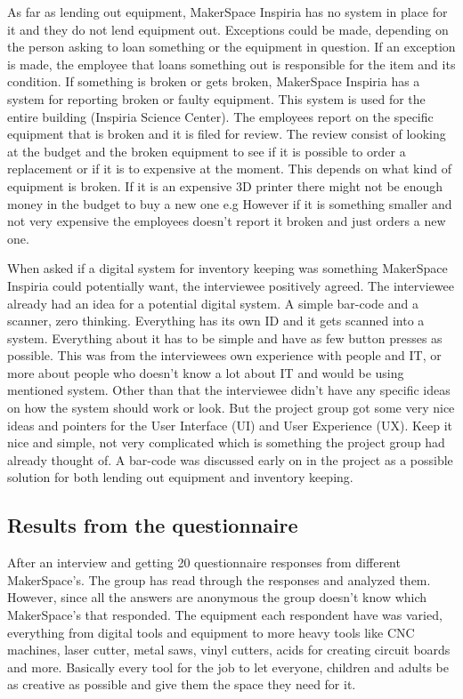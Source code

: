 As far as lending out equipment, MakerSpace Inspiria has no system in place for it and they do not lend equipment out. Exceptions could be made, depending on the person asking to loan something or the equipment in question. If an exception is made, the employee that loans something out is responsible for the item and its condition. If something is broken or gets broken, MakerSpace Inspiria has a system for reporting broken or faulty equipment. This system is used for the entire building (Inspiria Science Center). The employees report on the specific equipment that is broken and it is filed for review. The review consist of looking at the budget and the broken equipment to see if it is possible to order a replacement or if it is to expensive at the moment. This depends on what kind of equipment is broken. If it is an expensive 3D printer there might not be enough money in the budget to buy a new one e.g However if it is something smaller and not very expensive the employees doesn't report it broken and just orders a new one. 

When asked if a digital system for inventory keeping was something MakerSpace Inspiria could potentially want, the interviewee positively agreed. The interviewee already had an idea for a potential digital system. A simple bar-code and a scanner, zero thinking. Everything has its own ID and it gets scanned into a system. Everything about it has to be simple and have as few button presses as possible. This was from the interviewees own experience with people and IT, or more about people who doesn't know a lot about IT and would be using mentioned system. Other than that the interviewee didn't have any specific ideas on how the system should work or look. But the project group got some very nice ideas and pointers for the User Interface (UI) and User Experience (UX). Keep it nice and simple, not very complicated which is something the project group had already thought of. A bar-code was discussed early on in the project as a possible solution for both lending out equipment and inventory keeping. 

\subsection{Results from the questionnaire}

After an interview and getting 20 questionnaire responses from different MakerSpace's. The group has read through the responses and analyzed them. However, since all the answers are anonymous the group doesn't know which MakerSpace's that responded. The equipment each respondent have was varied, everything from digital tools and equipment to more heavy tools like CNC machines, laser cutter, metal saws, vinyl cutters, acids for creating circuit boards and more. Basically every tool for the job to let everyone, children and adults be as creative as possible and give them the space they need for it. 

